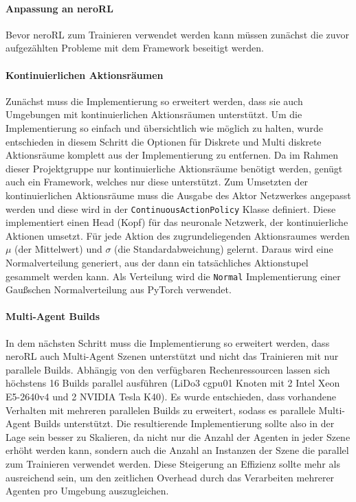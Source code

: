 \paragraph{Anpassung an neroRL} \label{neroAnpassungKonzept}
Bevor neroRL zum Trainieren verwendet werden kann müssen zunächst die zuvor aufgezählten Probleme mit dem Framework beseitigt werden.\\

\paragraph{Kontinuierlichen Aktionsräumen} \fup
\noindent Zunächst muss die Implementierung so erweitert werden, dass sie auch Umgebungen mit kontinuierlichen Aktionsräumen unterstützt. 
Um die Implementierung so einfach und übersichtlich wie möglich zu halten, wurde entschieden in diesem Schritt die Optionen für Diskrete und Multi diskrete Aktionsräume komplett aus der Implementierung zu entfernen. Da im Rahmen dieser Projektgruppe nur kontinuierliche Aktionsräume benötigt werden, genügt auch ein Framework, welches nur diese unterstützt. Zum Umsetzten der kontinuierlichen Aktionsräume muss die Ausgabe des Aktor Netzwerkes angepasst werden und diese wird in der \texttt{ContinuousActionPolicy} Klasse definiert. Diese implementiert einen Head (Kopf) für das neuronale Netzwerk, der kontinuierliche Aktionen umsetzt. Für jede Aktion des zugrundeliegenden Aktionsraumes werden $\mu$ (der Mittelwert) und $\sigma$ (die Standardabweichung) gelernt. Daraus wird eine Normalverteilung generiert, aus der dann ein tatsächliches Aktionstupel gesammelt werden kann. Als Verteilung wird die \texttt{Normal} Implementierung einer Gaußschen Normalverteilung aus PyTorch verwendet.

\paragraph{Multi-Agent Builds} \fup
\noindent In dem nächsten Schritt muss die Implementierung so erweitert werden, dass neroRL auch Multi-Agent Szenen unterstützt und nicht das Trainieren mit nur parallele Builds.
Abhängig von den verfügbaren Rechenressourcen lassen sich höchstens 16 Builds parallel ausführen (LiDo3 cgpu01 Knoten mit 2 Intel Xeon E5-2640v4 und 2 NVIDIA Tesla K40). 
Es wurde entschieden, dass vorhandene Verhalten mit mehreren parallelen Builds zu erweitert, sodass es parallele Multi-Agent Builds unterstützt. 
Die resultierende Implementierung sollte also in der Lage sein besser zu Skalieren, da nicht nur die Anzahl der Agenten in jeder Szene erhöht werden kann, sondern auch die Anzahl an Instanzen der Szene die parallel zum Trainieren verwendet werden. Diese Steigerung an Effizienz sollte mehr als ausreichend sein, um den zeitlichen Overhead durch das Verarbeiten mehrerer Agenten pro Umgebung auszugleichen.

